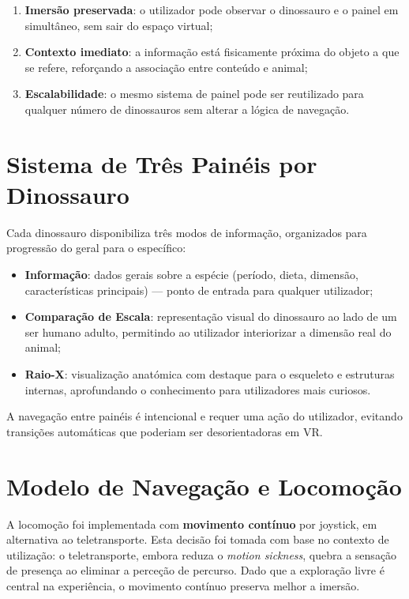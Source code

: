 \documentclass[a4paper,11pt]{report}
\begin{document}
\begin{enumerate}
    \setlength\itemsep{0pt}
    \item \textbf{Imersão preservada}: o utilizador pode observar o dinossauro
          e o painel em simultâneo, sem sair do espaço virtual;
    \item \textbf{Contexto imediato}: a informação está fisicamente próxima do
          objeto a que se refere, reforçando a associação entre conteúdo e animal;
    \item \textbf{Escalabilidade}: o mesmo sistema de painel pode ser reutilizado
          para qualquer número de dinossauros sem alterar a lógica de navegação.
\end{enumerate}

\section{Sistema de Três Painéis por Dinossauro}

Cada dinossauro disponibiliza três modos de informação, organizados para
progressão do geral para o específico:

\begin{itemize}
    \setlength\itemsep{0pt}
    \item \textbf{Informação}: dados gerais sobre a espécie (período, dieta,
          dimensão, características principais) --- ponto de entrada para
          qualquer utilizador;
    \item \textbf{Comparação de Escala}: representação visual do dinossauro
          ao lado de um ser humano adulto, permitindo ao utilizador
          interiorizar a dimensão real do animal;
    \item \textbf{Raio-X}: visualização anatómica com destaque para o
          esqueleto e estruturas internas, aprofundando o conhecimento
          para utilizadores mais curiosos.
\end{itemize}

A navegação entre painéis é intencional e requer uma ação do utilizador,
evitando transições automáticas que poderiam ser desorientadoras em VR.

\section{Modelo de Navegação e Locomoção}

A locomoção foi implementada com \textbf{movimento contínuo} por joystick,
em alternativa ao teletransporte. Esta decisão foi tomada com base no contexto
de utilização: o teletransporte, embora reduza o \textit{motion sickness},
quebra a sensação de presença ao eliminar a perceção de percurso. Dado que
a exploração livre é central na experiência, o movimento contínuo preserva
melhor a imersão.
\end{document}
